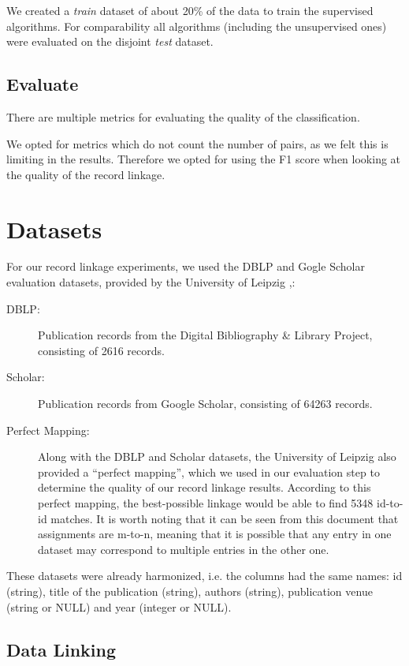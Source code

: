 \documentclass[sigconf,nonacm]{acmart}
\begin{document}
We created a \emph{train} dataset of about 20\% of the data to train
the supervised algorithms.
For comparability all algorithms (including the unsupervised ones)
were evaluated on the disjoint \emph{test} dataset.

\subsection{Evaluate}

There are multiple metrics for evaluating the quality of the classification.

We opted for metrics which do not count the number of pairs, as we felt
this is limiting in the results.
Therefore we opted for using the F1 score when looking at the quality
of the record linkage.

\section{Datasets}

For our record linkage experiments, we used the DBLP and Gogle Scholar evaluation datasets, provided by the University of Leipzig \cite{DataSets},\cite{kopcke2010evaluation}:

\begin{description}
\item[DBLP:] Publication records from the Digital Bibliography \& Library Project, consisting of 2616 records.  
\item[Scholar:] Publication records from Google Scholar, consisting of 64263 records.
\item[Perfect Mapping:] Along with the DBLP and Scholar datasets, the University of Leipzig also provided a ``perfect mapping'', which we used in our evaluation step to determine the quality of our record linkage results. According to this perfect mapping, the best-possible linkage would be able to find 5348 id-to-id matches. It is worth noting that it can be seen from this document that assignments are m-to-n, meaning that it is possible that any entry in one dataset may correspond to multiple entries in the other one.
\end{description}

These datasets were already harmonized, i.e. the columns had the same names: id (string), title of the publication (string), authors (string), publication venue (string or NULL) and year (integer or NULL).

\subsection{Data Linking}
\end{document}
